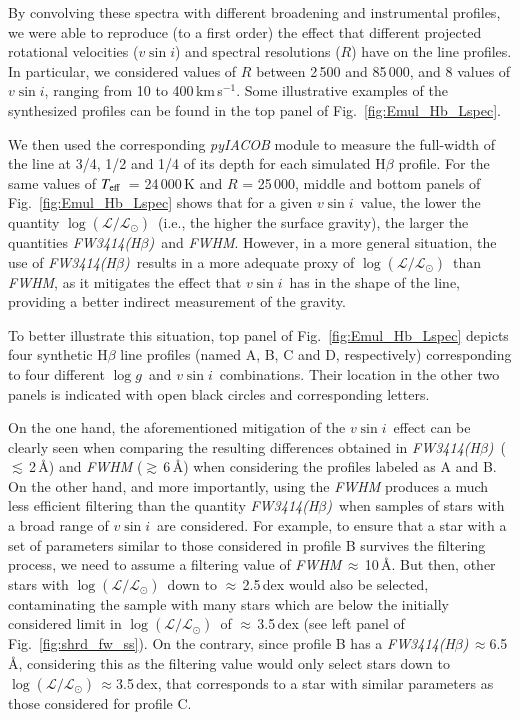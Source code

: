 \documentclass{aa}
\newcommand{\kms}{\mbox{km\,s$^{-1}$}}
\newcommand{\vsini}{\mbox{$v\sin i$}}
\newcommand{\Teff}{\mbox{$T_{\rm eff}$}}
\newcommand{\logg}{\mbox{$\log g$}}
\newcommand{\logLs}{$\log (\mathcal{L}/\mathcal{L}_{\odot})$}
\newcommand{\ls}{\mbox{$\lesssim$}}
\newcommand{\gs}{\mbox{$\gtrsim$}}
\newcommand{\fwhb}{\textit{FW3414(H$\beta$)}}
\begin{document}
By convolving these spectra with different broadening and instrumental profiles, we were able to reproduce (to a first order) the effect that different projected rotational velocities (\vsini) and spectral resolutions ($R$) have on the line profiles. In particular, we considered values of $R$ between 2\,500 and 85\,000, and 8 values of \vsini, ranging from 10 to 400\,\kms. Some illustrative examples of the synthesized profiles can be found in the top panel of Fig.~\ref{fig:Emul_Hb_Lspec}.

We then used the corresponding \textit{pyIACOB} module to measure the full-width of the line at 3/4, 1/2 and 1/4 of its depth for each simulated H$\beta$ profile. For the same values of \Teff\ = 24\,000\,K and $R$ = 25\,000, middle and bottom panels of Fig.~\ref{fig:Emul_Hb_Lspec} shows that for a given \vsini\ value, the lower the quantity \logLs\ (i.e., the higher the surface gravity), the larger the quantities \fwhb\ and \textit{FWHM}. However, in a more general situation, the use of \fwhb\ results in a more adequate proxy of \logLs\ than \textit{FWHM}, as it mitigates the effect that \vsini\ has in the shape of the line, providing a better indirect measurement of the gravity.

To better illustrate this situation, top panel of Fig.~\ref{fig:Emul_Hb_Lspec} depicts four synthetic H$\beta$ line profiles (named A, B, C and D, respectively) corresponding to four different \logg\ and \vsini\ combinations. Their location in the other two panels is indicated with open black circles and corresponding letters.

On the one hand, the aforementioned mitigation of the \vsini\ effect can be clearly seen when comparing the resulting differences obtained in \fwhb\ ($\ls$\,2\,\AA) and \textit{FWHM} ($\gs$\,6\,\AA) when considering the profiles labeled as A and B. On the other hand, and more importantly, using the \textit{FWHM} produces a much less efficient filtering than the quantity \fwhb\ when samples of stars with a broad range of \vsini\ are considered. For example, to ensure that a star with a set of parameters similar to those considered in profile B survives the filtering process, we need to assume a filtering value of \textit{FWHM}\,$\approx$\,10\,\AA. But then, other stars with \logLs\ down to $\approx$\,2.5\,dex would also be selected, contaminating the sample with many stars which are below the initially considered limit in \logLs\ of $\approx$\,3.5\,dex (see left panel of Fig.~\ref{fig:shrd_fw_ss}). On the contrary, since profile B has a \fwhb\,$\approx$6.5\,\AA, considering this as the filtering value would only select stars down to \logLs\,$\approx$3.5\,dex, that corresponds to a star with similar parameters as those considered for profile C.
\end{document}
